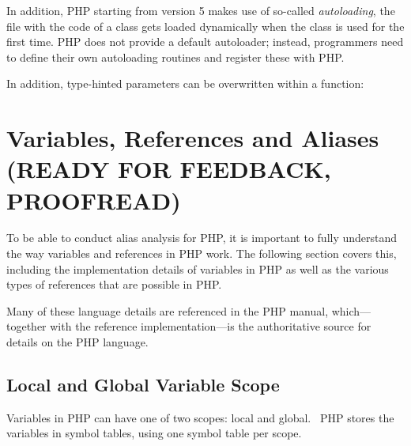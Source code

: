 In addition, PHP starting from version 5 makes use of so-called \emph{autoloading}, \ie the file with the code of a class gets loaded dynamically when the class is used for the first time. PHP does not provide a default autoloader; instead, programmers need to define their own autoloading routines and register these with PHP.~\cite{php-manual-autoloading}


In addition, type-hinted parameters can be overwritten within a function:




\section{Variables, References and Aliases (READY FOR FEEDBACK, PROOFREAD)}
\label{php-variables}

To be able to conduct alias analysis for PHP, it is important to fully understand the way variables and references in PHP work. The following section covers this, including the implementation details of variables in PHP as well as the various types of references that are possible in PHP.

Many of these language details are referenced in the PHP manual, which---together with the reference implementation---is the authoritative source for details on the PHP language.


\subsection{Local and Global Variable Scope}
\label{sec:variable-scope}

Variables in PHP can have one of two scopes: local and global.~\cite{php-manual-scope} PHP stores the variables in symbol tables, using one symbol table per scope.~\cite{php-manual-reference-counting}

